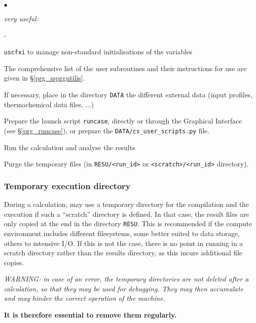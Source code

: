 {{{\begin{list}{$\bullet$}{}
\begin{list}{}{}
\begin{list}{}{}
        \item {\em very useful:}
        \begin{list}{-}{}
                \item \texttt{uscfxi} to manage non-standard initialisations of the variables
        \end{list}
    \end{list}

\end{list}


The comprehensive list of the user subroutines and their instructions
      for use are given in \S\ref{prg_ssprgutilis}.

\item If necessary, place in the directory \texttt{DATA} the different
      external data (input profiles, thermochemical data files, ...)

\item Prepare the launch script \texttt{runcase}, directly or through the
      Graphical Interface (see \S\ref{prg_runcase}), or prepare the
      \texttt{DATA/cs\_user\_scripts.py} file.

\item Run the calculation and analyse the results

\item Purge the temporary files (in \texttt{RESU/<run\_id>} or
      \texttt{<scratch>/<run\_id>} directory).
\end{list}


\subsubsection{Temporary execution directory}
\label{prg_temporarydirectory}%
During a calculation, \CS may use a temporary directory for the compilation and
the execution if such a ``scratch'' directory is defined. In that case, the
result files are only copied at the end in the directory
\texttt{RESU}. This is recommended if the compute environment includes different
filesystems, some better suited to data storage, others to intensive I/O.
If this is not the case, there is no point in running in a scratch directory
rather than the results directory, as this incurs additional file copies.

\noindent
{\em WARNING: in case of an error, the temporary directories are not deleted
after a calculation, so that they may be used for debugging. They may then
accumulate and may hinder the correct operation of the machine.\\
\centerline{\bf It is therefore essential to remove them regularly.}}


}}}

